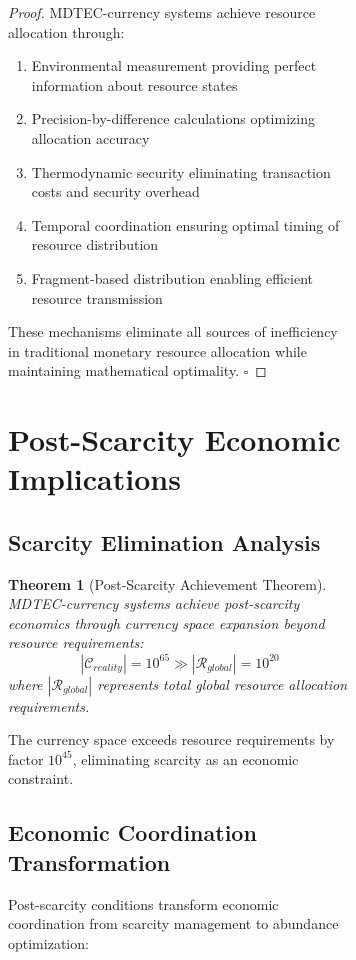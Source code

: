 \documentclass[12pt,a4paper]{article}
\newtheorem{theorem}{Theorem}
\begin{document}
\begin{figure}[H]
\begin{figure}[H]
\begin{proof}
MDTEC-currency systems achieve resource allocation through:
\begin{enumerate}
\item Environmental measurement providing perfect information about resource states
\item Precision-by-difference calculations optimizing allocation accuracy
\item Thermodynamic security eliminating transaction costs and security overhead
\item Temporal coordination ensuring optimal timing of resource distribution
\item Fragment-based distribution enabling efficient resource transmission
\end{enumerate}

These mechanisms eliminate all sources of inefficiency in traditional monetary resource allocation while maintaining mathematical optimality. $\square$
\end{proof}

\section{Post-Scarcity Economic Implications}

\subsection{Scarcity Elimination Analysis}

\begin{theorem}[Post-Scarcity Achievement Theorem]
MDTEC-currency systems achieve post-scarcity economics through currency space expansion beyond resource requirements:
\begin{equation}
|\mathcal{C}_{reality}| = 10^{65} \gg |\mathcal{R}_{global}| = 10^{20}
\end{equation}
where $|\mathcal{R}_{global}|$ represents total global resource allocation requirements.
\end{theorem}

The currency space exceeds resource requirements by factor $10^{45}$, eliminating scarcity as an economic constraint.

\subsection{Economic Coordination Transformation}

Post-scarcity conditions transform economic coordination from scarcity management to abundance optimization:


\end{figure}
\end{figure}
\end{document}
